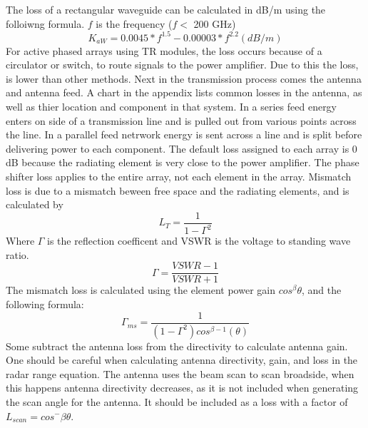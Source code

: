 \documentclass[12pt]{article}
\begin{document}
The loss of a rectangular waveguide can be calculated in dB/m using the folloiwng formula. $f$ is the frequency ($f<$ 200 GHz)
\begin{equation}
    K_{aW} = 0.0045 * f^{1.5} -0.00003 * f^{2.2} (dB/m)
\end{equation}
For active phased arrays using TR modules, the loss occurs because of a circulator or switch, to route signals to the power amplifier. Due to this the loss, is lower than other methods. 
Next in the transmission process comes the antenna and antenna feed. A chart in the appendix lists common losses in the antenna, as well as thier location and component in that system. In a series feed energy enters on side of a transmission line and is pulled out from various points across the line. In a parallel feed netrwork energy is sent across a line and is split before delivering power to each component. The default loss assigned to each array is 0 dB because the radiating element is very close to the power amplifier. The phase shifter loss applies to the entire array, not each element in the array. Mismatch loss is due to a mismatch beween free space and the radiating elements, and is calculated by 
\begin{equation}
    L_T = \frac{1}{1-\Gamma^2}
\end{equation}
Where $\Gamma$ is the reflection coefficent and VSWR is the voltage to standing wave ratio. 
\begin{equation}
    \Gamma = \frac{VSWR-1}{VSWR+1}
\end{equation}
The mismatch loss is calculated using the element power gain ${cos}^{\beta}\theta$, and the following formula:
\begin{equation}
    \Gamma_{ms} = \frac{1}{ (1-\Gamma^2) {cos}^{\beta-1} (\theta) }
\end{equation}
Some subtract the antenna loss from the directivity to calculate antenna gain. One should be careful when calculating antenna directivity, gain, and loss in the radar range equation. The antenna uses the beam scan to scan broadside, when this happens antenna directivity decreases, as it is not included when generating the scan angle for the antenna. It should be included as a loss with a factor of $ L_{scan} = {cos}^-\beta \theta$.
\end{document}
